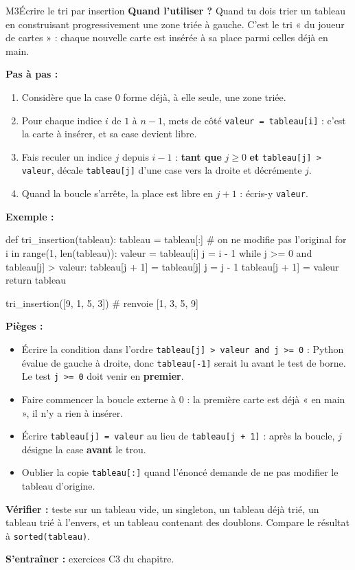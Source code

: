 \begin{fichemethode}{M3}{Écrire le tri par insertion}
\textbf{Quand l'utiliser ?} Quand tu dois trier un tableau en construisant progressivement
une zone triée à gauche. C'est le tri « du joueur de cartes » : chaque nouvelle carte est
insérée à sa place parmi celles déjà en main.

\textbf{Pas à pas :}
\begin{enumerate}
  \item Considère que la case $0$ forme déjà, à elle seule, une zone triée.
  \item Pour chaque indice $i$ de $1$ à $n-1$, mets de côté \lstinline{valeur = tableau[i]} :
    c'est la carte à insérer, et sa case devient libre.
  \item Fais reculer un indice $j$ depuis $i-1$ : \textbf{tant que} $j \geqslant 0$
    \textbf{et} \lstinline{tableau[j] > valeur}, décale \lstinline{tableau[j]} d'une case
    vers la droite et décrémente $j$.
  \item Quand la boucle s'arrête, la place est libre en $j+1$ : écris-y \lstinline{valeur}.
\end{enumerate}

\textbf{Exemple :}
\begin{python}
def tri_insertion(tableau):
    tableau = tableau[:]          # on ne modifie pas l'original
    for i in range(1, len(tableau)):
        valeur = tableau[i]
        j = i - 1
        while j >= 0 and tableau[j] > valeur:
            tableau[j + 1] = tableau[j]
            j = j - 1
        tableau[j + 1] = valeur
    return tableau

tri_insertion([9, 1, 5, 3])   # renvoie [1, 3, 5, 9]
\end{python}

\textbf{Pièges :}
\begin{itemize}
  \item Écrire la condition dans l'ordre \lstinline{tableau[j] > valeur and j >= 0} : Python
    évalue de gauche à droite, donc \lstinline{tableau[-1]} serait lu avant le test de
    borne. Le test \lstinline{j >= 0} doit venir en \textbf{premier}.
  \item Faire commencer la boucle externe à $0$ : la première carte est déjà « en main »,
    il n'y a rien à insérer.
  \item Écrire \lstinline{tableau[j] = valeur} au lieu de \lstinline{tableau[j + 1]} : après
    la boucle, $j$ désigne la case \textbf{avant} le trou.
  \item Oublier la copie \lstinline{tableau[:]} quand l'énoncé demande de ne pas modifier
    le tableau d'origine.
\end{itemize}

\textbf{Vérifier :} teste sur un tableau vide, un singleton, un tableau déjà trié, un
tableau trié à l'envers, et un tableau contenant des doublons. Compare le résultat à
\lstinline{sorted(tableau)}.

\textbf{S'entraîner :} exercices C3 du chapitre.
\end{fichemethode}
